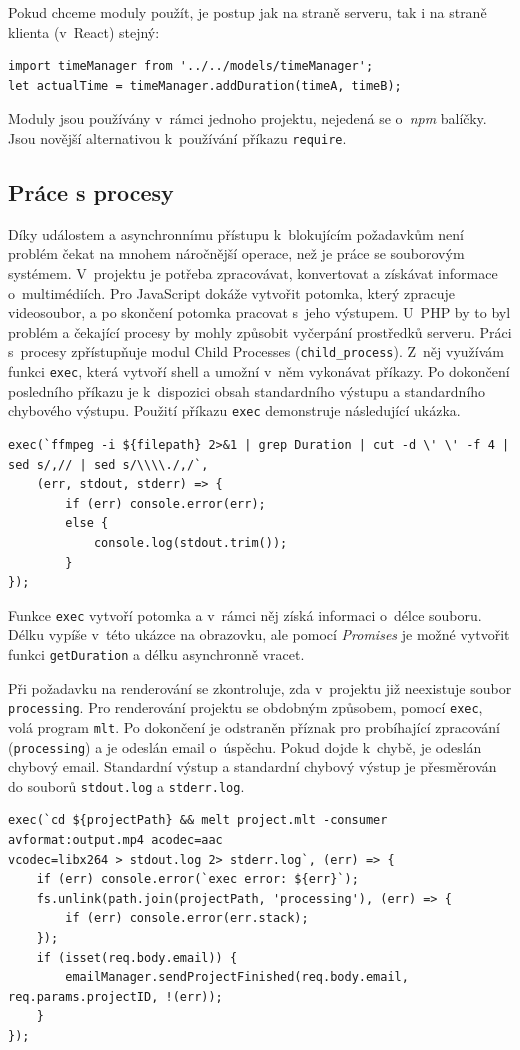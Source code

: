 Pokud chceme moduly použít, je postup jak na straně serveru, tak i na straně klienta (v~React) stejný:
\begin{lstlisting}[style=JavaScript]
import timeManager from '../../models/timeManager';
let actualTime = timeManager.addDuration(timeA, timeB);
\end{lstlisting}

Moduly jsou používány v~rámci jednoho projektu, nejedená se o~\textit{npm} balíčky. Jsou novější alternativou k~používání příkazu \texttt{require}.

\subsection{Práce s procesy}\label{cap:Práce s procesy}
Díky událostem a asynchronnímu přístupu k~blokujícím požadavkům není problém čekat na mnohem náročnější operace, než je práce se souborovým systémem. V~projektu je potřeba zpracovávat, konvertovat a získávat informace o~multimédiích. Pro JavaScript dokáže vytvořit potomka, který zpracuje videosoubor, a po skončení potomka pracovat s~jeho výstupem. U~PHP by to byl problém a čekající procesy by mohly způsobit vyčerpání prostředků serveru. Práci s~procesy zpřístupňuje modul Child Processes (\texttt{child\_process}). Z~něj využívám funkci \texttt{exec}, která vytvoří shell a umožní v~něm vykonávat příkazy. Po dokončení posledního příkazu je k~dispozici obsah standardního výstupu a standardního chybového výstupu. Použití příkazu \texttt{exec} demonstruje následující ukázka.
\begin{lstlisting}[style=JavaScript]
exec(`ffmpeg -i ${filepath} 2>&1 | grep Duration | cut -d \' \' -f 4 | sed s/,// | sed s/\\\\./,/`,
    (err, stdout, stderr) => {
        if (err) console.error(err);
        else {
            console.log(stdout.trim());
        }
});
\end{lstlisting}
Funkce \texttt{exec} vytvoří potomka a v~rámci něj získá informaci o~délce souboru. Délku vypíše v~této ukázce na obrazovku, ale pomocí \textit{Promises} je možné vytvořit funkci \texttt{getDuration} a délku asynchronně vracet.

Při požadavku na renderování se zkontroluje, zda v~projektu již neexistuje soubor \texttt{processing}. Pro renderování projektu se obdobným způsobem, pomocí \texttt{exec}, volá program \texttt{mlt}. Po dokončení je odstraněn příznak pro probíhající zpracování (\texttt{processing}) a je odeslán email o~úspěchu. Pokud dojde k~chybě, je odeslán chybový email. Standardní výstup a standardní chybový výstup je přesměrován do souborů \texttt{stdout.log} a \texttt{stderr.log}.
\begin{lstlisting}[style=JavaScript]
exec(`cd ${projectPath} && melt project.mlt -consumer avformat:output.mp4 acodec=aac
vcodec=libx264 > stdout.log 2> stderr.log`, (err) => {
    if (err) console.error(`exec error: ${err}`);
    fs.unlink(path.join(projectPath, 'processing'), (err) => {
        if (err) console.error(err.stack);
    });
    if (isset(req.body.email)) {
        emailManager.sendProjectFinished(req.body.email, req.params.projectID, !(err));
    }
});
\end{lstlisting}\textbf{}

